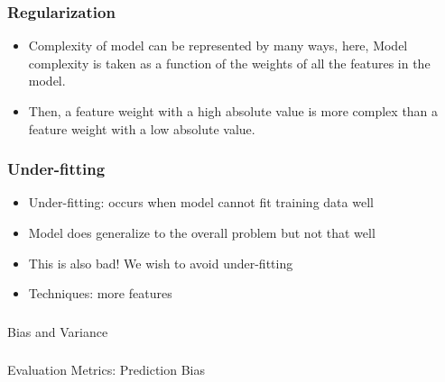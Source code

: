 \begin{frame}[fragile]\frametitle{Regularization}


	\begin{itemize}
	\item Complexity of model can be represented by many ways, here, Model complexity is taken as a function of the weights of all the features in the model.
	\item Then, a feature weight with a high absolute value is more complex than a feature weight with a low absolute value.
	\end{itemize}
	
\end{frame}



\begin{frame}[fragile]\frametitle{Under-fitting}
\begin{itemize}
\item Under-fitting: occurs when model cannot fit training data well
\item Model does generalize to the overall problem but not that well
\item This is also bad! We wish to avoid under-fitting
\item Techniques: more features
\end{itemize}
\end{frame}

\begin{frame}[fragile]\frametitle{}
\begin{center}
{\Large Bias and Variance}
\end{center}
\end{frame}


\begin{frame}[fragile]\frametitle{}
\begin{center}
{\Large Evaluation Metrics: Prediction Bias}
\end{center}
\end{frame}

